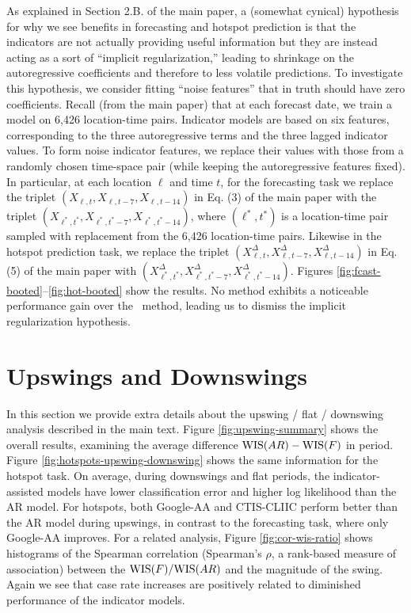As explained in Section 2.B. of the main paper, a (somewhat cynical) hypothesis
for why we see benefits in forecasting and hotspot prediction is that the
indicators are not actually providing useful information but they are instead
acting as a sort of ``implicit regularization,'' leading to shrinkage on the
autoregressive coefficients and therefore to less volatile predictions.  To
investigate this hypothesis, we consider fitting ``noise features'' that in
truth should have zero coefficients.  Recall (from the main paper) that at each
forecast date, we train a model on 6,426 location-time pairs.  Indicator models
are based on six features, corresponding to the three autoregressive terms and
the three lagged indicator values.  To form noise indicator features, we replace
their values with those from a randomly chosen time-space pair (while keeping
the autoregressive features fixed).  In particular, at each location $\ell$ and
time $t$, for the forecasting task we replace the triplet $(X_{\ell,t},
X_{\ell,t-7}, X_{\ell,t-14})$ in Eq. (3) of the main paper with the triplet
$(X_{\ell^*,t^*}, X_{\ell^*,t^*-7}, X_{\ell^*,t^*-14})$, where $(\ell^*,t^*)$ is
a location-time pair sampled with replacement from the 6,426 location-time
pairs.  Likewise in the hotspot prediction task, we replace the triplet
$(X_{\ell,t}^\Delta, X_{\ell,t-7}^\Delta, X_{\ell,t-14}^\Delta)$ in Eq. (5) of
the main paper with $(X_{\ell^*,t^*}^\Delta, X_{\ell^*,t^*-7}^\Delta,
X_{\ell^*,t^*-14}^\Delta)$.  Figures
\ref{fig:fcast-booted}--\ref{fig:hot-booted} show the results.  No method
exhibits a noticeable performance gain over the \ar~method, leading us to
dismiss the implicit regularization hypothesis.

\section{Upswings and Downswings}

In this section we provide extra details about the upswing / flat / downswing
analysis described in the main text. Figure \ref{fig:upswing-summary} shows the
overall results, examining the average difference $\mathrm{WIS}(AR) - \mathrm{WIS}(F)$ in
period. Figure \ref{fig:hotspots-upswing-downswing} shows the same information
for the hotspot task. On average, during downswings and flat periods, the
indicator-assisted models have lower classification error and higher log
likelihood than the AR model. For hotspots, both Google-AA and CTIS-CLIIC
perform better than the AR model during upswings, in contrast to the forecasting
task, where only Google-AA improves. For a related analysis, Figure
\ref{fig:cor-wis-ratio} shows histograms of the Spearman correlation (Spearman's
$\rho$, a rank-based measure of association) between the $\mathrm{WIS}(F)/\mathrm{WIS}(AR)$ and
the magnitude of the swing. Again we see that case rate increases are positively
related to diminished performance of the indicator models.

